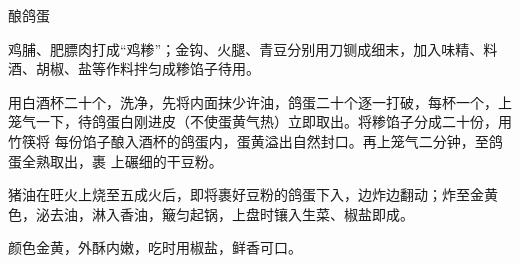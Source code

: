 %
%
%
%
%
%
%
\begin{recipe}{酿鸽蛋}

\ingredients


\preparation

\step 鸡脯、肥膘肉打成“鸡糁”；金钩、火腿、青豆分别用刀铡成细末，加入味精、料
酒、胡椒、盐等作料拌匀成糁馅子待用。

\step 用白酒杯二十个，洗净，先将内面抹少许油，鸽蛋二十个逐一打破，每杯一个，上
笼气一下，待鸽蛋白刚进皮（不使蛋黄气热）立即取出。将糁馅子分成二十份，用竹筷将
每份馅子酿入酒杯的鸽蛋内，蛋黄溢出自然封口。再上笼气二分钟，至鸽蛋全熟取出，裹
上碾细的干豆粉。

\step 猪油在旺火上烧至五成火后，即将裹好豆粉的鸽蛋下入，边炸边翻动；炸至金黄
色，泌去油，淋入香油，簸匀起锅，上盘时镶入生菜、椒盐即成。

\features

颜色金黄，外酥内嫩，吃时用椒盐，鲜香可口。

\end{recipe}

